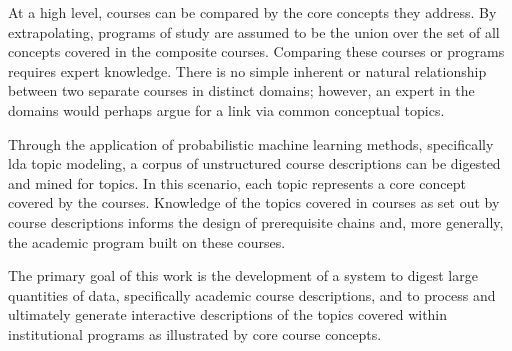 At a high level, courses can be compared by the core concepts they address.
By extrapolating, programs of study are assumed to be the union over the set
of all concepts covered in the composite courses. Comparing these courses
or programs requires expert knowledge. There is no simple inherent or
natural relationship between two separate courses in distinct domains;
however, an expert in the domains would perhaps argue for a link via common
conceptual topics.

Through the application of  probabilistic machine learning methods,
specifically \ac{lda} topic modeling, a corpus of unstructured course
descriptions can be digested and mined for topics. In this scenario, each topic
represents a core concept covered by the courses. Knowledge of the topics
covered in courses as set out by course descriptions informs the design of
prerequisite chains and, more generally, the academic program built on
these courses.

The primary goal of this work is the development of a system to digest
large quantities of data, specifically academic course descriptions, and to
process and ultimately generate interactive descriptions of the topics
covered within institutional programs as illustrated by core course
concepts.


